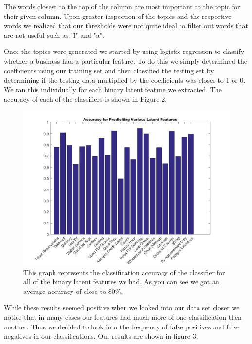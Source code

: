 \documentclass{article}
\begin{document}
The words closest to the top of the column are most important to the topic for their given column.  Upon greater inspection of the topics and the respective words we realized that our thresholds were not quite ideal to filter out words that are not useful such as "I" and "a".

Once the topics were generated we started by using logistic regression to classify whether a business had a particular feature. To do this we simply determined the coefficients using our training set and then classified the testing set by determining if the testing data multiplied by the coefficients was closer to 1 or 0. We ran this individually for each binary latent feature we extracted. The accuracy of each of the classifiers is shown in Figure 2.

\begin{figure}[!h]
\centering
\includegraphics[scale = .3]{fpAccuracy}
\caption{This graph represents the classification accuracy of the classifier for all of the binary latent features we had. As you can see we got an average accuracy of close to 80\%.}
\end{figure}

While these results seemed positive when we looked into our data set closer we notice that in many cases our features had much more of one classification then another. Thus we decided to look into the frequency of false positives and false negatives in our classifications. Our results are shown in figure 3.
\end{document}
